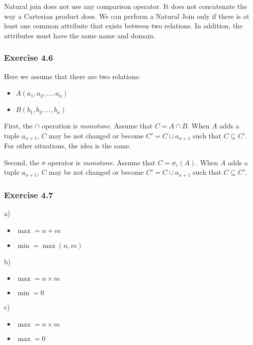 \documentclass[../../main.tex]{subfiles}
\begin{document}
Natural join does not use any comparison operator. It
does not concatenate the way a Cartesian product does.
We can perform a Natural Join only if there is at least
one common attribute that exists between two relations.
In addition, the attributes must have the same name and
domain.

\subsubsection*{Exercise 4.6}

Here we assume that there are two relations:

\begin{itemize}
  \item $A(a_{1},a_{2},\dots,a_{n})$
  \item $B(b_{1},b_{2},\dots,b_{n})$
\end{itemize}

First, the $\cap$ operation is \emph{monotone}. Assume that
$C = A \cap B$. When $A$ adds a tuple $a_{n + 1}$, $C$ may
be not changed or become $C' = C \cup a_{n + 1}$ such that
$C \subseteq C'$. For other situations, the idea is the same.

Second, the $\sigma$ operator is \emph{monotone}. Assume that
$C = \sigma_{c}(A)$. When $A$ adds a tuple $a_{n + 1}$, $C$ may
be not changed or become $C' = C \cup a_{n + 1}$ such that
$C \subseteq C'$.

\subsubsection*{Exercise 4.7}

a)

\begin{itemize}
  \item $\max =  n + m$
  \item $\min = \max(n, m)$
\end{itemize}

b)

\begin{itemize}
  \item $\max = n \times m$
  \item $\min = 0$
\end{itemize}

c)

\begin{itemize}
  \item $\max = n \times m$
  \item $\max = 0$
\end{itemize}
\end{document}
